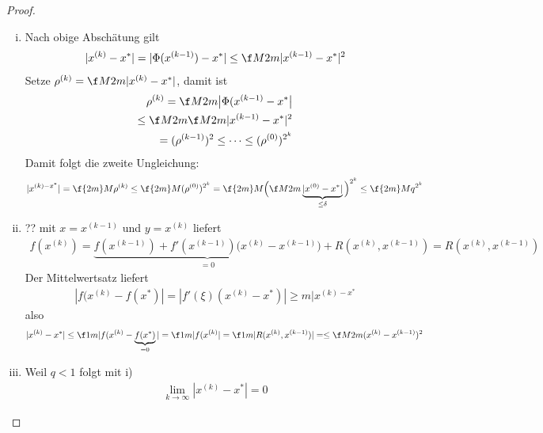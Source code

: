 \documentclass[11pt]{scrartcl}
\begin{document}
\begin{st}
\begin{note}
\begin{proof}
			\begin{enumerate}[i)]
				\item
					Nach obige Abschätung gilt
					\begin{align*}
						|x^{(k)}-x^*| = |\Phi(x^{(k-1)}) - x^*| \le \f M{2m} |x^{(k-1)} - x^*|^2
					\end{align*}
					Setze $\rho^{(k)} = \f M{2m}|x^{(k)}-x^*|$, damit ist
					\begin{align*}
						\rho^{(k)} 
						= \f M{2m} \big| \Phi(x^{(k-1)} - x^*\big| \\
						\le \f M{2m} \f M{2m} |x^{(k-1)} - x^*|^2 \\
						= (\rho^{(k-1)})^2
						\le \dotsb \le
						(\rho^{(0)})^{2^k}
					\end{align*}
					Damit folgt die zweite Ungleichung:
					\begin{align*}
						|x^{(k) -x^*}|
						= \f {2m}M \rho^{(k)}
						\le \f {2m}M (\rho^{(0)})^{2^k}
						= \f {2m}M \Big( \f M{2m} \underbrace{|x^{(0)}-x^*|}_{\le \delta} \Big)^{2^k}
						\le \f {2m}M q^{2^k}
					\end{align*}
				\item
					?? mit $x = x^{(k-1)}$ und $y=x^{(k)}$ liefert
					\begin{align*}
						f(x^{(k)}) = \underbrace{f(x^{(k-1)}) + f'(x^{(k-1)})\big(x^{(k)}-x^{(k-1)}\big)}_{=0} + R(x^{(k)},x^{(k-1)}) = R(x^{(k)},x^{(k-1)})
					\end{align*}
					Der Mittelwertsatz liefert
					\begin{align*}
						|f(x^{(k)} -f(x^*)| = |f'(\xi)(x^{(k)}-x^*)| \ge m|x^{(k) -x^*}
					\end{align*}
					also
					\begin{align*}
						|x^{(k)} -x^*|
						\le \f 1m |f(x^{(k)} - \underbrace{f(x^*)}_{=0}|
						= \f 1m |f(x^{(k)}|
						= \f 1m |R(x^{(k)}, x^{(k-1)}) |
						= \le \f M{2m} (x^{(k)} -x^{(k-1)})^2
					\end{align*}
				\item
					Weil $q<1$ folgt mit i)
					\begin{align*}
						\lim_{k\to \infty} |x^{(k)} -x^*| = 0
					\end{align*}
			\end{enumerate}
		\end{proof}
	\end{note}
\end{st}
\end{document}
